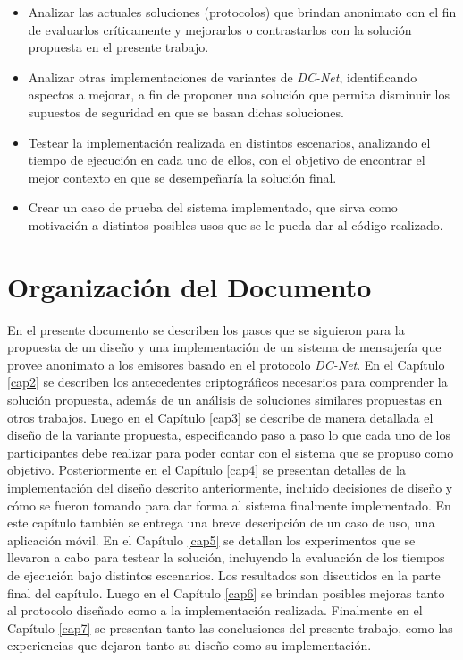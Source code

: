 \begin{itemize}
    \item Analizar las actuales soluciones (protocolos) que brindan anonimato 
    con el fin de evaluarlos críticamente y mejorarlos o contrastarlos con la 
    solución propuesta en el presente trabajo.
    \item Analizar otras implementaciones de variantes de \emph{DC-Net}, 
    identificando aspectos a mejorar, a fin de proponer una solución que 
    permita disminuir los supuestos de seguridad en que se basan dichas 
    soluciones.
    \item Testear la implementación realizada en distintos escenarios, 
    analizando el tiempo de ejecución en cada uno de ellos, con el objetivo 
    de encontrar el mejor contexto en que se desempeñaría la solución final.
    \item Crear un caso de prueba del sistema implementado, que sirva como 
    motivación a distintos posibles usos que se le pueda dar al código 
    realizado.
\end{itemize}

\section{Organización del Documento}

En el presente documento se describen los pasos que se siguieron para la 
propuesta de un diseño y una implementación de un sistema de mensajería que 
provee anonimato a los emisores basado en el protocolo \emph{DC-Net}. En el 
Capítulo \ref{cap2} se describen los antecedentes criptográficos 
necesarios para comprender la solución propuesta, además de un análisis de 
soluciones similares propuestas en otros trabajos. Luego en el Capítulo 
\ref{cap3} se describe de manera detallada el diseño de la variante propuesta, 
especificando paso a paso lo que cada uno de los participantes debe realizar 
para poder contar con el sistema que se propuso como objetivo. Posteriormente 
en el Capítulo \ref{cap4} se presentan detalles de la implementación del 
diseño descrito anteriormente, incluido decisiones de diseño y cómo se fueron 
tomando para dar forma al sistema finalmente implementado. En este capítulo 
también se entrega una breve descripción de un caso de uso, una aplicación 
móvil. En el Capítulo \ref{cap5} se detallan los experimentos que se llevaron 
a cabo para testear la solución, incluyendo la evaluación de los tiempos de 
ejecución bajo distintos escenarios. Los resultados son discutidos en la parte 
final del capítulo. Luego en el Capítulo \ref{cap6} se brindan posibles 
mejoras tanto al protocolo diseñado como a la implementación realizada. 
Finalmente en el Capítulo \ref{cap7} se presentan tanto las conclusiones del 
presente trabajo, como las experiencias que dejaron tanto su diseño como su 
implementación.